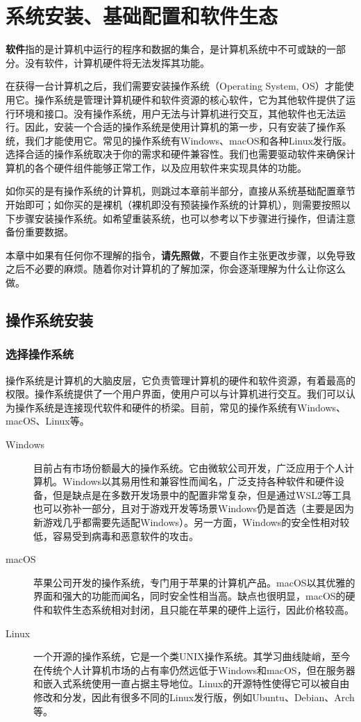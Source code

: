 \chapter{系统安装、基础配置和软件生态}\label{chap:install-software}

\textbf{软件}指的是计算机中运行的程序和数据的集合，是计算机系统中不可或缺的一部分。没有软件，计算机硬件将无法发挥其功能。

在获得一台计算机之后，我们需要安装操作系统（Operating System, OS）才能使用它。操作系统是管理计算机硬件和软件资源的核心软件，它为其他软件提供了运行环境和接口。没有操作系统，用户无法与计算机进行交互，其他软件也无法运行。因此，安装一个合适的操作系统是使用计算机的第一步，只有安装了操作系统，我们才能使用它。常见的操作系统有Windows、macOS和各种Linux发行版。选择合适的操作系统取决于你的需求和硬件兼容性。我们也需要驱动软件来确保计算机的各个硬件组件能够正常工作，以及应用软件来实现具体的功能。

如你买的是有操作系统的计算机，则跳过本章前半部分，直接从系统基础配置章节开始即可；如你买的是裸机（裸机即没有预装操作系统的计算机），则需要按照以下步骤安装操作系统。如希望重装系统，也可以参考以下步骤进行操作，但请注意备份重要数据。

本章中如果有任何你不理解的指令，\textbf{请先照做}，不要自作主张更改步骤，以免导致之后不必要的麻烦。随着你对计算机的了解加深，你会逐渐理解为什么让你这么做。

\section{操作系统安装}

\subsection{选择操作系统}

操作系统是计算机的大脑皮层，它负责管理计算机的硬件和软件资源，有着最高的权限。操作系统提供了一个用户界面，使用户可以与计算机进行交互。我们可以认为操作系统是连接现代软件和硬件的桥梁。目前，常见的操作系统有Windows、macOS、Linux等。

\begin{description}
  \item[Windows\faWindows] 目前占有市场份额最大的操作系统。它由微软公司开发，广泛应用于个人计算机。Windows以其易用性和兼容性而闻名，广泛支持各种软件和硬件设备，但是缺点是在多数开发场景中的配置非常复杂，但是通过WSL2等工具也可以弥补一部分，且对于游戏开发等场景Windows仍是首选（主要是因为新游戏几乎都需要先适配Windows）。另一方面，Windows的安全性相对较低，容易受到病毒和恶意软件的攻击。
  \item[macOS\faApple] 苹果公司开发的操作系统，专门用于苹果的计算机产品。macOS以其优雅的界面和强大的功能而闻名，同时安全性相当高。缺点也很明显，macOS的硬件和软件生态系统相对封闭，且只能在苹果的硬件上运行，因此价格较高。
  \item[Linux\faLinux] 一个开源的操作系统，它是一个类UNIX操作系统。其学习曲线陡峭，至今在传统个人计算机市场的占有率仍然远低于Windows和macOS，但在服务器和嵌入式系统使用一直占据主导地位。Linux的开源特性使得它可以被自由修改和分发，因此有很多不同的Linux发行版，例如Ubuntu、Debian、Arch等。
\end{description}

